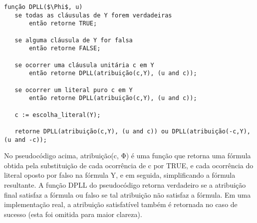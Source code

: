 \documentclass[a4paper, 12pt]{article}
\begin{document}
\begin{verbatim}
função DPLL($\Phi$, u)
   se todas as cláusulas de Y forem verdadeiras 
       então retorne TRUE;
       
   se alguma cláusula de Y for falsa
       então retorne FALSE;
       
   se ocorrer uma cláusula unitária c em Y
       então retorne DPLL(atribuição(c,Y), (u and c));
       
   se ocorrer um literal puro c em Y
       então retorne DPLL(atribuição(c,Y), (u and c));
       
   c := escolha_literal(Y);
   
   retorne DPLL(atribuição(c,Y), (u and c)) ou DPLL(atribuição(-c,Y), (u and -c));
\end{verbatim}

 No pseudocódigo acima, atribuição(c, Φ) é uma função que retorna uma fórmula obtida pela substituição de cada ocorrência
 de c por TRUE, e cada ocorrência do literal oposto por falso na fórmula Y, e em seguida, simplificando a fórmula resultante.
 A função DPLL do pseudocódigo retorna verdadeiro se a atribuição final satisfaz a fórmula ou falso se tal atribuição não satisfaz 
 a fórmula. Em uma implementação real, a atribuição satisfatível também é retornada no caso de sucesso (esta foi omitida para maior clareza).







% 
\end{document}
